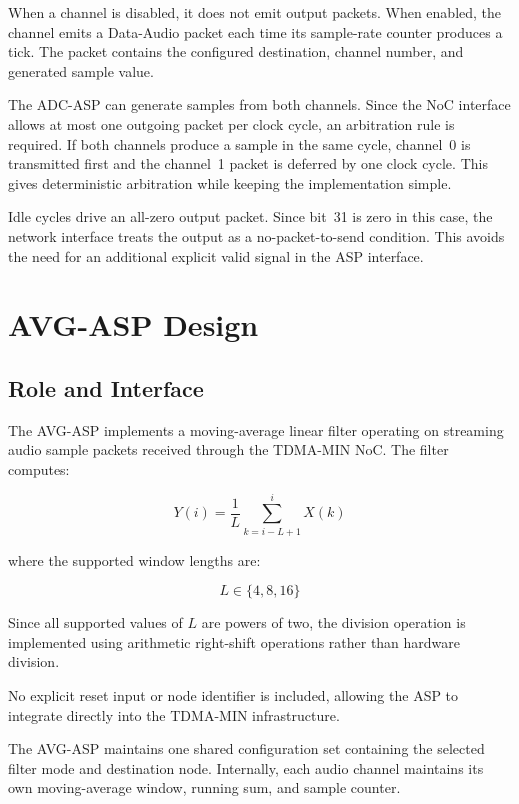 \documentclass[10pt, a4paper]{article}
\begin{document}
When a channel is disabled, it does not emit output packets. When enabled, the channel emits a Data-Audio packet each time its sample-rate counter produces a tick. The packet contains the configured destination, channel number, and generated sample value.

The ADC-ASP can generate samples from both channels. Since the NoC interface allows at most one outgoing packet per clock cycle, an arbitration rule is required. If both channels produce a sample in the same cycle, channel~0 is transmitted first and the channel~1 packet is deferred by one clock cycle. This gives deterministic arbitration while keeping the implementation simple.

Idle cycles drive an all-zero output packet. Since bit~31 is zero in this case, the network interface treats the output as a no-packet-to-send condition. This avoids the need for an additional explicit valid signal in the ASP interface.

\section{AVG-ASP Design}
\label{sec:avg_asp_design}

\subsection{Role and Interface}

The AVG-ASP implements a moving-average linear filter operating on streaming audio sample packets received through the TDMA-MIN NoC. The filter computes:

\begin{equation}
Y(i)=\frac{1}{L}\sum_{k=i-L+1}^{i}X(k)
\end{equation}

where the supported window lengths are:

\begin{equation}
L \in \{4,8,16\}
\end{equation}

Since all supported values of $L$ are powers of two, the division operation is implemented using arithmetic right-shift operations rather than hardware division.

No explicit reset input or node identifier is included, allowing the ASP to integrate directly into the TDMA-MIN infrastructure.

The AVG-ASP maintains one shared configuration set containing the selected filter mode and destination node. Internally, each audio channel maintains its own moving-average window, running sum, and sample counter.
\end{document}

